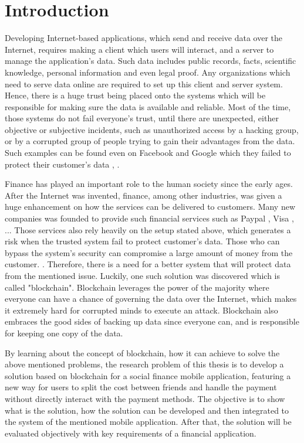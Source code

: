 \chapter{Introduction}
\label{ch:Introduction}

Developing Internet-based applications, which send and receive data over the Internet, requires making a client which users will interact, and a server to manage the application's data. Such data includes public records, facts, scientific knowledge, personal information and even legal proof. Any organizations which need to serve data online are required to set up this client and server system. Hence, there is a huge trust being placed onto the systems which will be responsible for making sure the data is available and reliable. Most of the time, those systems do not fail everyone's trust, until there are unexpected, either objective or subjective incidents, such as unauthorized access by a hacking group, or by a corrupted group of people trying to gain their advantages from the data. Such examples can be found even on Facebook and Google which they failed to protect their customer's data \citep{FacebookLeakData}, \citep{GoogleLeakData}.

Finance has played an important role to the human society since the early ages. After the Internet was invented, finance, among other industries, was given a huge enhancement on how the services can be delivered to customers. Many new companies was founded to provide such financial services such as Paypal \citep{Paypal}, Visa \citep{Visa}, ... Those services also rely heavily on the setup stated above, which generates a risk when the trusted system fail to protect customer's data. Those who can bypass the system's security can compromise a large amount of money from the customer. \citep{IndianBankHack}. Therefore, there is a need for a better system that will protect data from the mentioned issue. Luckily, one such solution was discovered which is called "blockchain". Blockchain leverages the power of the majority where everyone can have a chance of governing the data over the Internet, which makes it extremely hard for corrupted minds to execute an attack. Blockchain also embraces the good sides of backing up data since everyone can, and is responsible for keeping one copy of the data.

By learning about the concept of blockchain, how it can achieve to solve the above mentioned problems, the research problem of this thesis is to develop a solution based on blockchain for a social finance mobile application, featuring a new way for users to split the cost between friends and handle the payment without directly interact with the payment methods. The objective is to show what is the solution, how the solution can be developed and then integrated to the system of the mentioned mobile application. After that, the solution will be evaluated objectively with key requirements of a financial application.

